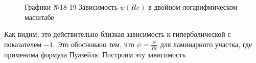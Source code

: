 \documentclass[a4paper]{article}
\begin{document}
\begin{enumerate}
\begin{figure}[h!]
\caption[]{\label{} Графики №18-19 Зависимость $\psi(Re)$ в двойном логарифмическом масштабе}
\end{figure}
\clearpage
Как видим, это действительно близкая зависимость к гиперболической с показателем $-1$. Это обосновано тем, что $\psi = \frac{8}{Re}$ для ламинарного участка, где применима формула Пуазейля. Построим эту зависимость
\begin{figure}[h!]

\end{figure}
\end{enumerate}
\end{document}
